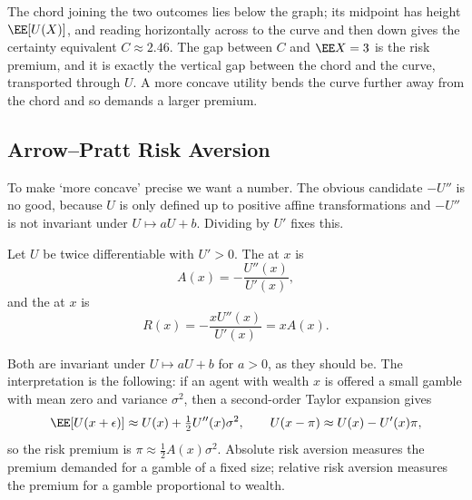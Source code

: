 \begin{center}
\end{center}

The chord joining the two outcomes lies below the graph; its midpoint has height $\EE[U(X)]$, and reading horizontally across to the curve and then down gives the certainty equivalent $C \approx 2.46$. The gap between $C$ and $\EE X = 3$ is the risk premium, and it is exactly the vertical gap between the chord and the curve, transported through $U$. A more concave utility bends the curve further away from the chord and so demands a larger premium.

\subsection{Arrow--Pratt Risk Aversion}

To make `more concave' precise we want a number. The obvious candidate $-U''$ is no good, because $U$ is only defined up to positive affine transformations and $-U''$ is not invariant under $U \mapsto aU + b$. Dividing by $U'$ fixes this.

\begin{definition}
	Let $U$ be twice differentiable with $U' > 0$. The  at $x$ is
	$$
	A(x) = -\frac{U''(x)}{U'(x)},
	$$
	and the  at $x$ is
	$$
	R(x) = -\frac{xU''(x)}{U'(x)} = xA(x).
	$$
\end{definition}

Both are invariant under $U \mapsto aU + b$ for $a > 0$, as they should be. The interpretation is the following: if an agent with wealth $x$ is offered a small gamble with mean zero and variance $\sigma^2$, then a second-order Taylor expansion gives
$$
\EE[U(x + \epsilon)] \approx U(x) + \tfrac12 U''(x)\sigma^2, \qquad U(x - \pi) \approx U(x) - U'(x)\pi,
$$
so the risk premium is $\pi \approx \tfrac12 A(x)\sigma^2$. Absolute risk aversion measures the premium demanded for a gamble of a fixed size; relative risk aversion measures the premium for a gamble proportional to wealth.

